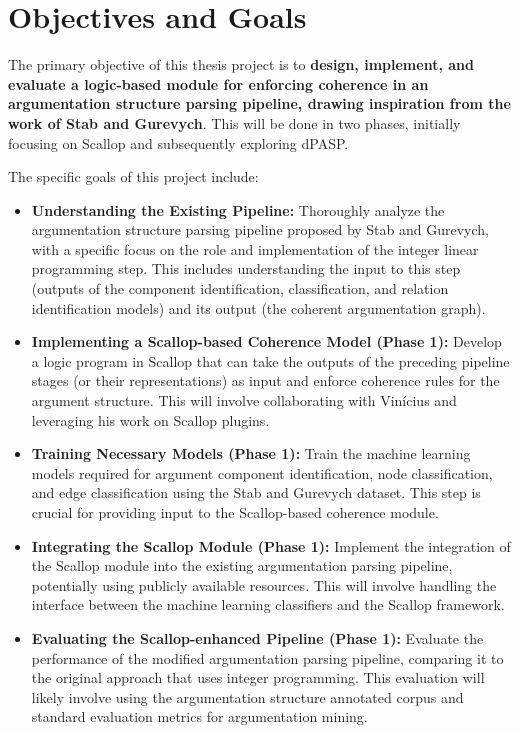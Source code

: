 \documentclass{article}
\begin{document}
\section{Objectives and Goals}

The primary objective of this thesis project is to \textbf{design, implement,
and evaluate a logic-based module for enforcing coherence in an argumentation
structure parsing pipeline, drawing inspiration from the work of Stab and
Gurevych}. This will be done in two phases, initially focusing on Scallop and
subsequently exploring dPASP.

The specific goals of this project include:

\begin{itemize}
    \item \textbf{Understanding the Existing Pipeline:} Thoroughly analyze the
    argumentation structure parsing pipeline proposed by Stab and Gurevych, with
    a specific focus on the role and implementation of the integer linear
    programming step. This includes understanding the input to this step
    (outputs of the component identification, classification, and relation
    identification models) and its output (the coherent argumentation graph).

    \item \textbf{Implementing a Scallop-based Coherence Model (Phase 1):}
    Develop a logic program in Scallop that can take the outputs
    of the preceding pipeline stages (or their representations) as input and
    enforce coherence rules for the argument structure. This will involve
    collaborating with Vinícius and leveraging his work on Scallop plugins.

    \item \textbf{Training Necessary Models (Phase 1):} Train the machine
    learning models required for argument component identification, node
    classification, and edge classification using the Stab and Gurevych
    dataset. This step is crucial for providing input to the Scallop-based
    coherence module.

    \item \textbf{Integrating the Scallop Module (Phase 1):} Implement the
    integration of the Scallop module into the existing argumentation parsing
    pipeline, potentially using publicly available resources. This will involve
    handling the interface between the machine learning classifiers and the
    Scallop framework.

    \item \textbf{Evaluating the Scallop-enhanced Pipeline (Phase 1):} Evaluate
    the performance of the modified argumentation parsing pipeline, comparing it
    to the original approach that uses integer programming. This evaluation
    will likely involve using the argumentation structure annotated corpus and
    standard evaluation metrics for argumentation mining.


\end{itemize}
\end{document}
